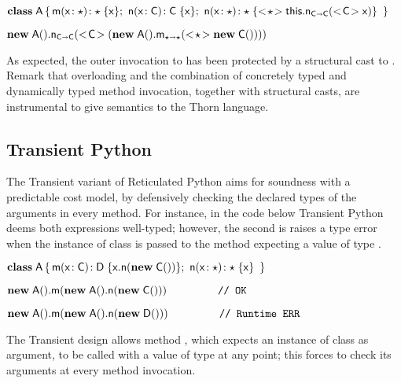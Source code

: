 \documentclass[acmlarge, anonymous, authordraft, review]{acmart} %
\newcommand{\FZ}[1]{\textbf{FZ: #1}}
\begin{document}
\medskip
\(
 \Class \A {
    \Mdef \m\x\any \any  \x  ; \ 
    \Mdef \n\x\C\C  \x ; \  \Mdef \n\x\any\any {\SubCast \any {\KCall \this \n {\SubCast \C \x}  \C \C }}   %
    }
\)
\medskip

\( \KCall {\New \A{}} \n {\SubCast \C {( \KCall {\New \A{}} \m {\SubCast \any {\New \C{}}} \any \any)}} \C \C \)

\medskip

\noindent As expected, the outer invocation to \n has been protected by a
structural cast to \C.  Remark that \kafka overloading and the combination
of concretely typed and dynamically typed method invocation, together with
structural casts, are instrumental to give semantics to the Thorn language.


 

\subsection{Transient Python}

The Transient variant of Reticulated Python aims for soundness
with a predictable cost model, by defensively checking the declared types of the arguments in every method.  For instance, in the code below Transient Python deems both expressions well-typed;  however, the
second is raises a type error when the instance of class \D is passed to the method \m
expecting a value of type \C.  

\smallskip
\(\Class \A  { \Mdef \m\x\C \D  {\Call \x\n{\New{\C}{}}}  ; \  \Mdef \n\x\any \any  \x} \)

\smallskip
\(\Call {\New\A{}} \m{\Call {\New \A{}} \n {\New \C{}}} \ \ \ \ \ \ \ \ \ \ \ \ \ \ \texttt{// OK}\)

\(\Call {\New\A{}} \m{\Call {\New \A{}} \n {\New \D{}}} \ \ \ \ \ \ \ \ \ \ \ \ \ \ \texttt{// Runtime ERR}\)
\smallskip

\noindent 
The Transient design allows method \m, which expects an instance of
class \C as argument, to be called with a value of type \any at any point; this forces
\m to check its arguments at every method invocation.   
\end{document}
